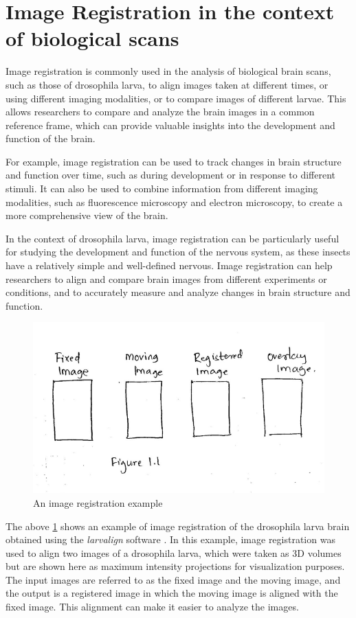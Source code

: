 \documentclass{report}
\begin{document}
	\section{Image Registration in the context of biological scans}
	Image registration is commonly used in the analysis of biological brain scans, such as those of drosophila larva, to align images taken at different times, or using different imaging modalities, or to compare images of different larvae. This allows researchers to compare and analyze the brain images in a common reference frame, which can provide valuable insights into the development and function of the brain.
	
	For example, image registration can be used to track changes in brain structure and function over time, such as during development or in response to different stimuli. It can also be used to combine information from different imaging modalities, such as fluorescence microscopy and electron microscopy, to create a more comprehensive view of the brain.
	
	In the context of drosophila larva, image registration can be particularly useful for studying the development and function of the nervous system, as these insects have a relatively simple and well-defined nervous. Image registration can help researchers to align and compare brain images from different experiments or conditions, and to accurately measure and analyze changes in brain structure and function.
	
	\begin{figure}[H]
		\centering
		\includegraphics[width=0.7\columnwidth]{resources/chapter1/figure1.png}
		\caption{An image registration example}
		\label{fig:Registration}
	\end{figure}
	
	The above \ref{fig:Registration} shows an example of image registration of the drosophila larva brain obtained using the \textit{larvalign} software \cite{larvalign}. In this example, image registration was used to align two images of a drosophila larva, which were taken as 3D volumes but are shown here as maximum intensity projections for visualization purposes. The input images are referred to as the fixed image and the moving image, and the output is a registered image in which the moving image is aligned with the fixed image. This alignment can make it easier to analyze the images.
	
\end{document}
